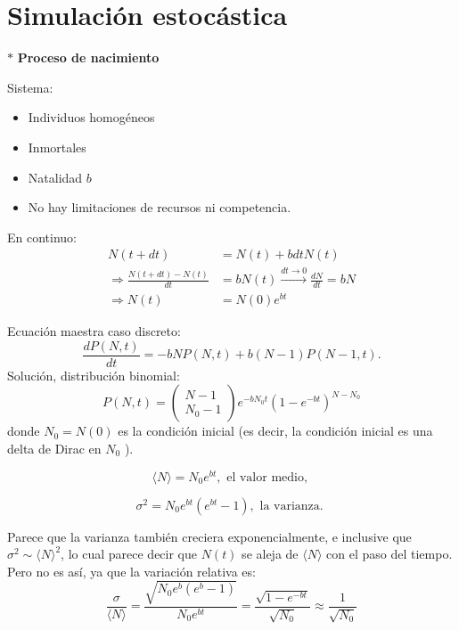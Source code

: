 \documentclass[%
 reprint,
 amsmath,amssymb,
 aps,
]{revtex4-1}
\begin{document}
\section{Simulación estocástica}

$*$ \textbf{Proceso de nacimiento}

Sistema:
\begin{itemize}
  \item Individuos homogéneos
  \item Inmortales
  \item Natalidad $b$
  \item No hay limitaciones de recursos ni competencia. 
\end{itemize}

En continuo:
$$
\begin{aligned}
  N(t+d t) &= N(t)+b d t N(t) \\
  \Rightarrow \frac{N(t+d t)-N(t)}{d t} &= b N(t) \stackrel{d t \rightarrow 0}{\longrightarrow} \frac{d N}{d t}=b N \\
  \Rightarrow N(t) &= N(0) e^{b t}
\end{aligned}
$$


Ecuación maestra caso discreto:
$$
  \frac{d P(N, t)}{d t}=-b N P(N, t)+b(N-1) P(N-1, t) .
$$
Solución, distribución binomial: 
$$
P(N, t)=\left(\begin{array}{c}
N-1 \\
N_{0}-1
\end{array}\right) e^{-b N_{0} t}\left(1-e^{-b t}\right)^{N-N_{0}}
$$
donde $N_{0}=N(0)$ es la condición inicial (es decir, la condición inicial es una delta de Dirac en $N_{0}$ ).

$$
\langle N\rangle=N_{0} e^{b t}, \text { el valor medio, }
$$

$$
\sigma^{2}=N_{0} e^{b t}\left(e^{b t}-1\right), \text { la varianza. }
$$

Parece que la varianza también creciera exponencialmente, e inclusive que $\sigma^{2} \sim\langle N\rangle^{2}$, lo cual parece decir que $N(t)$ se aleja de $\langle N\rangle$ con el paso del tiempo. Pero no es así, ya que la variación relativa es:
$$
\frac{\sigma}{\langle N\rangle}=\frac{\sqrt{N_{0} e^{b}\left(e^{b}-1\right)}}{N_{0} e^{b t}}=\frac{\sqrt{1-e^{- b{t} }}}{\sqrt{N_{0}}} \approx \frac{1}{\sqrt{N_{0}}}
$$
\end{document}
